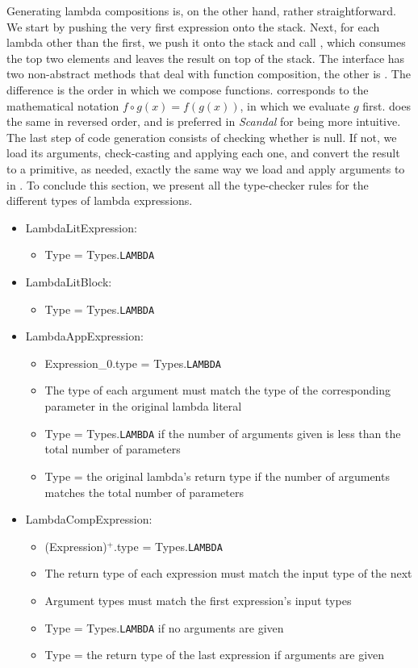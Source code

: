 Generating lambda compositions is, on the other hand, rather straightforward. We start by pushing the very first expression onto the stack. Next, for each lambda other than the first, we push it onto the stack and call , which consumes the top two elements and leaves the result on top of the stack. The  interface has two non-abstract methods that deal with function composition, the other is . The difference is the order in which we compose functions.  corresponds to the mathematical notation $f \circ g(x) = f(g(x))$, in which we evaluate $g$ first.  does the same in reversed order, and is preferred in \emph{Scandal} for being more intuitive. The last step of code generation consists of checking whether  is null. If not, we load its arguments, check-casting and applying each one, and convert the result to a primitive, as needed, exactly the same way we load and apply arguments to in . To conclude this section, we present all the type-checker rules for the different types of lambda expressions.

\begin{itemize}
	\item LambdaLitExpression:
		\begin{itemize}
			\item Type = Types.\texttt{LAMBDA}
		\end{itemize}
	\item LambdaLitBlock:
		\begin{itemize}
			\item Type = Types.\texttt{LAMBDA}
		\end{itemize}
	\item LambdaAppExpression:
		\begin{itemize}
			\item Expression\_0.type = Types.\texttt{LAMBDA}
			\item The type of each argument must match the type of the corresponding parameter in the original lambda literal
			\item Type = Types.\texttt{LAMBDA} if the number of arguments given is less than the total number of parameters
			\item Type = the original lambda's return type if the number of arguments matches the total number of parameters
		\end{itemize}
	\item LambdaCompExpression:
		\begin{itemize}
			\item (Expression)$^+$.type = Types.\texttt{LAMBDA}
			\item The return type of each expression must match the input type of the next
			\item Argument types must match the first expression's input types
			\item Type = Types.\texttt{LAMBDA} if no arguments are given
			\item Type = the return type of the last expression if arguments are given
		\end{itemize}
\end{itemize}

